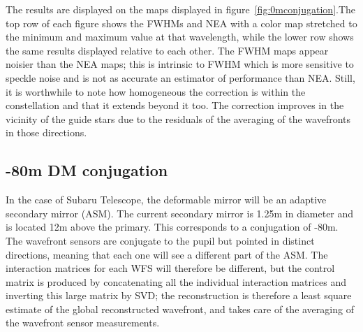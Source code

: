 \documentclass[aas_macros,10pt]{article}
\begin{document}
The results are displayed on the maps displayed in figure~\ref{fig:0mconjugation}.The top row of 
each figure shows the FWHMs and NEA with a color map stretched to the minimum and maximum value at 
that wavelength, while the lower row shows the same results displayed relative to each other. The FWHM 
maps appear noisier than the NEA maps; this is intrinsic to FWHM which is more sensitive to speckle noise 
and is not as accurate an estimator of performance than NEA. Still, it is worthwhile to note how 
homogeneous the correction is within the constellation and that it extends beyond it too. The correction 
improves in the vicinity of the guide stars due to the residuals of the averaging of the wavefronts in 
those directions.


\subsection{-80m DM conjugation}

In the case of Subaru Telescope, the deformable mirror will be an adaptive secondary mirror (ASM). 
The current secondary mirror is 1.25m in diameter and is located 12m above the primary. This 
corresponds to a conjugation of -80m. The wavefront sensors are conjugate to the pupil but pointed 
in distinct directions, meaning that each one will see a different part of the ASM. The interaction 
matrices for each WFS will therefore be different, but the control matrix is produced by concatenating 
all the individual interaction matrices and inverting this large matrix by SVD; the reconstruction is 
therefore a least square estimate of the global reconstructed wavefront, and takes care of the averaging 
of the wavefront sensor measurements.
\end{document}
